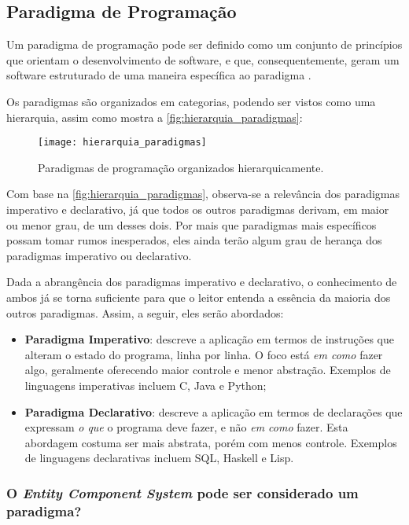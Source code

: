 \subsection{Paradigma de Programação}

Um paradigma de programação pode ser definido como um conjunto de princípios que orientam o desenvolvimento de software, e que, consequentemente, geram um software estruturado de uma maneira específica ao paradigma \cite{programmingparadigmsionos}.

Os paradigmas são organizados em categorias, podendo ser vistos como uma hierarquia, assim como mostra a \autoref{fig:hierarquia_paradigmas}:

\begin{figure}[H]
	\centering
	\texttt{[image: hierarquia\_paradigmas]}
	\caption{Paradigmas de programação organizados hierarquicamente.}
	\label{fig:hierarquia_paradigmas}
\end{figure}

Com base na \autoref{fig:hierarquia_paradigmas}, observa-se a relevância dos paradigmas imperativo e declarativo, já que todos os outros paradigmas derivam, em maior ou menor grau, de um desses dois. Por mais que paradigmas mais específicos possam tomar rumos inesperados, eles ainda terão algum grau de herança dos paradigmas imperativo ou declarativo.

Dada a abrangência dos paradigmas imperativo e declarativo, o conhecimento de ambos já se torna suficiente para que o leitor entenda a essência da maioria dos outros paradigmas. Assim, a seguir, eles serão abordados:

\begin{itemize}
	\item \textbf{Paradigma Imperativo}: descreve a aplicação em termos de instruções que alteram o estado do programa, linha por linha. O foco está \textit{em como} fazer algo, geralmente oferecendo maior controle e menor abstração. Exemplos de linguagens imperativas incluem C, Java e Python;
	\item \textbf{Paradigma Declarativo}: descreve a aplicação em termos de declarações que expressam \textit{o que} o programa deve fazer, e não \textit{em como} fazer. Esta abordagem costuma ser mais abstrata, porém com menos controle. Exemplos de linguagens declarativas incluem SQL, Haskell e Lisp.
\end{itemize}

\subsubsection{O \textit{Entity Component System} pode ser considerado um paradigma?}


